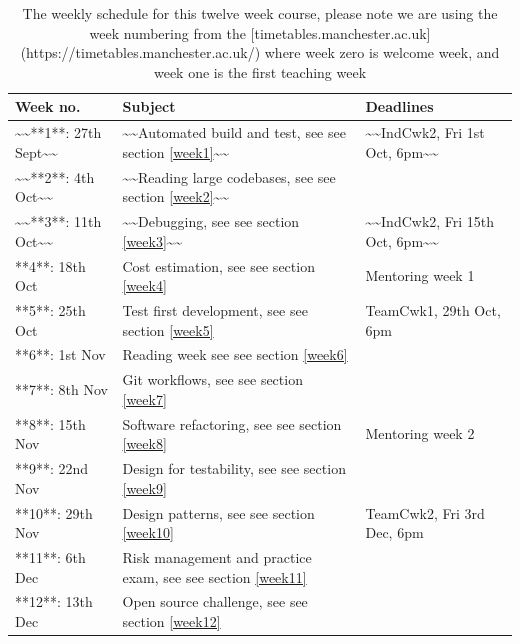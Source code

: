 \documentclass[
]{book}
\begin{document}
\begin{table}

\caption{\label{tab:schedtable}The weekly schedule for this twelve week course, please note we are using the week numbering from the [timetables.manchester.ac.uk](https://timetables.manchester.ac.uk/) where week zero is welcome week, and week one is the first teaching week}
\centering
\begin{tabular}[t]{lll}
\toprule
Week no. & Subject & Deadlines\\
\midrule
\textasciitilde{}\textasciitilde{}**1**: 27th Sept\textasciitilde{}\textasciitilde{} & \textasciitilde{}\textasciitilde{}Automated build and test, see see section \ref{week1}\textasciitilde{}\textasciitilde{} & \textasciitilde{}\textasciitilde{}IndCwk2, Fri 1st Oct, 6pm\textasciitilde{}\textasciitilde{}\\
\textasciitilde{}\textasciitilde{}**2**: 4th Oct\textasciitilde{}\textasciitilde{} & \textasciitilde{}\textasciitilde{}Reading large codebases, see see section \ref{week2}\textasciitilde{}\textasciitilde{} & \\
\textasciitilde{}\textasciitilde{}**3**: 11th Oct\textasciitilde{}\textasciitilde{} & \textasciitilde{}\textasciitilde{}Debugging, see see section \ref{week3}\textasciitilde{}\textasciitilde{} & \textasciitilde{}\textasciitilde{}IndCwk2, Fri 15th Oct, 6pm\textasciitilde{}\textasciitilde{}\\
**4**: 18th Oct & Cost estimation, see see section \ref{week4} & Mentoring week 1\\
**5**: 25th Oct & Test first development, see see section \ref{week5} & TeamCwk1, 29th Oct, 6pm\\
\addlinespace
**6**: 1st Nov & Reading week see see section \ref{week6} & \\
**7**: 8th Nov & Git workflows, see see section \ref{week7} & \\
**8**: 15th Nov & Software refactoring, see see section \ref{week8} & Mentoring week 2\\
**9**: 22nd Nov & Design for testability, see see section \ref{week9} & \\
**10**: 29th Nov & Design patterns, see see section \ref{week10} & TeamCwk2, Fri 3rd Dec, 6pm\\
\addlinespace
**11**: 6th Dec & Risk management and practice exam, see see section \ref{week11} & \\
**12**: 13th Dec & Open source challenge, see see section \ref{week12} & \\
\bottomrule
\end{tabular}
\end{table}
\end{document}

